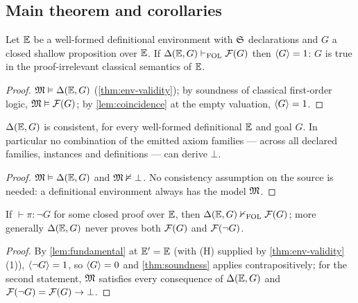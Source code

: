 \subsection{Main theorem and corollaries}
\label{sec:soundness-main}

\begin{theorem}[Soundness]
\label{thm:soundness}
Let $\mathbb{E}$ be a well-formed definitional environment with $\mathfrak{S}$
declarations and $G$ a closed shallow proposition over $\mathbb{E}$.  If
$\Delta(\mathbb{E},G) \vdash_{\mathrm{FOL}} \mathcal{F}(G)$ then $\langle G \rangle = 1$: $G$ is true in the
proof-irrelevant classical semantics of $\mathbb{E}$.
\end{theorem}

\begin{proof}
$\mathfrak{M} \vDash \Delta(\mathbb{E},G)$ (\cref{thm:env-validity}); by soundness of classical
first-order logic, $\mathfrak{M} \vDash \mathcal{F}(G)$; by \cref{lem:coincidence} at the
empty valuation, $\langle G \rangle = 1$.
\end{proof}

\begin{corollary}[Consistency]
\label{cor:consistency}
$\Delta(\mathbb{E},G)$ is consistent, for every well-formed definitional $\mathbb{E}$ and
goal $G$.  In particular no combination of the emitted axiom families
--- across all declared families, instances and definitions --- can
derive $\bot$.
\end{corollary}

\begin{proof}
$\mathfrak{M} \vDash \Delta(\mathbb{E},G)$ and $\mathfrak{M} \nvDash \bot$.  No consistency assumption on
the source is needed: a definitional environment always has the model
$\mathfrak{M}$.
\end{proof}

\begin{corollary}
\label{cor:no-refutable}
If $\vdash \pi : \neg G$ for some closed proof over $\mathbb{E}$, then $\Delta(\mathbb{E},G)
\nvdash_{\mathrm{FOL}} \mathcal{F}(G)$; more generally $\Delta(\mathbb{E},G)$ never proves both
$\mathcal{F}(G)$ and $\mathcal{F}(\neg G)$.
\end{corollary}

\begin{proof}
By \cref{lem:fundamental} at $\mathbb{E}' = \mathbb{E}$ (with (H) supplied by
\cref{thm:env-validity}(1)),
$\langle \neg G \rangle = 1$, so $\langle G \rangle = 0$ and \cref{thm:soundness} applies
contrapositively; for the second statement, $\mathfrak{M}$ satisfies every
consequence of $\Delta(\mathbb{E},G)$ and $\mathcal{F}(\neg G) = \mathcal{F}(G) \to \bot$.
\end{proof}


